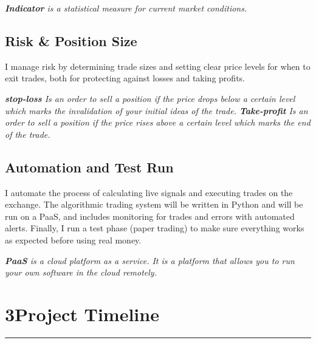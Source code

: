 \documentclass[12pt,a4paper]{article}
\begin{document}
\vspace{0.5em}
\noindent\textit{\footnotesize%
\textbf{Indicator} is a statistical measure for current market conditions.
}







\subsection{Risk \& Position Size}
I manage risk by determining trade sizes and setting clear price levels for when to exit trades, both for protecting against losses and taking profits. 

\vspace{0.5em}
\noindent\textit{\footnotesize%
\textbf{stop-loss} Is an order to sell a position if the price drops below a certain level which marks the invalidation of your initial ideas of the trade.
\textbf{Take-profit} Is an order to sell a position if the price rises above a certain level which marks the end of the trade.
}




\newpage

\subsection{Automation and Test Run}


I automate the process of calculating live signals and executing trades on the exchange. The algorithmic trading system will be written in Python and will be run on a PaaS, and includes monitoring for trades and errors with automated alerts. Finally, I run a test phase (paper trading) to make sure everything works as expected before using real money.

\vspace{0.5em}
\noindent\textit{\footnotesize%
\textbf{PaaS} is a cloud platform as a service. It is a platform that allows you to run your own software in the cloud remotely.}


\section*{3\hspace{1em}Project Timeline}
\vspace{-0.5em}
\noindent\rule{\textwidth}{0.5pt}
\end{document}
